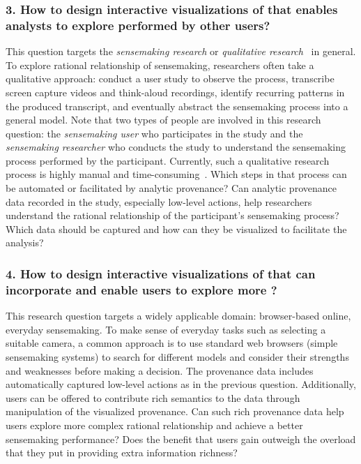 \subsubsection*{3. How to design interactive visualizations of  that enables analysts to explore  performed by other users?}
This question targets the \emph{sensemaking research} or \emph{qualitative research}~\cite{Adams2008} in general. To explore rational relationship of sensemaking, researchers often take a qualitative approach: conduct a user study to observe the process, transcribe screen capture videos and think-aloud recordings, identify recurring patterns in the produced transcript, and eventually abstract the sensemaking process into a general model. Note that two types of people are involved in this research question: the \emph{sensemaking user} who participates in the study and the \emph{sensemaking researcher} who conducts the study to understand the sensemaking process performed by the participant. Currently, such a qualitative research process is highly manual and time-consuming~\cite{Wong2002}. Which steps in that process can be automated or facilitated by analytic provenance? Can analytic provenance data recorded in the study, especially low-level actions, help researchers understand the rational relationship of the participant's sensemaking process? Which data should be captured and how can they be visualized to facilitate the analysis? 

\subsubsection*{4. How to design interactive visualizations of  that can incorporate  and enable users to explore more ?}

This research question targets a widely applicable domain: browser-based online, everyday sensemaking. To make sense of everyday tasks such as selecting a suitable camera, a common approach is to use standard web browsers (simple sensemaking systems) to search for different models and consider their strengths and weaknesses before making a decision. The provenance data includes automatically captured low-level actions as in the previous question. Additionally, users can be offered to contribute rich semantics to the data through manipulation of the visualized provenance. Can such rich provenance data help users explore more complex rational relationship and achieve a better sensemaking performance? Does the benefit that users gain outweigh the overload that they put in providing extra information richness?

